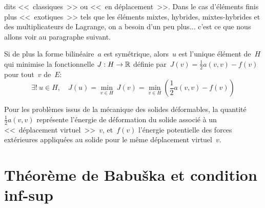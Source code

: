 \medskip
{} dits <<~classiques~>> ou <<~en déplacement~>>.
Dans le cas d'éléments finis plus <<~exotiques~>> tels que les éléments
mixtes, hybrides, mixtes-hybrides et des multiplicateurs de Lagrange, on a besoin d'un peu plus... c'est ce que nous allons voir au paragraphe suivant.


\begin{theoreme}
Si de plus la forme bilinéaire~$a$ est symétrique, alors~$u$ est
l'unique élément de~$H$ qui minimise la fonctionnelle
$J: H\rightarrow\mathbb R$ définie par~$J(v) = \frac12 a(v,v)-f(v)$ pour tout~$v$ de~$E$:
\begin{equation}
\exists!\ u \in H,\quad J(u) = \min_{v\in H}\ J(v) = \min_{v\in H} \left( \frac12 a(v,v) - f(v) \right)
\end{equation}
\end{theoreme}


\medskip



Pour les problèmes issus de la mécanique des solides déformables, la quantité~$\frac12 a(v,v)$ représente l'énergie de déformation du solide associé à un <<~déplacement virtuel~>>~$v$, et~$f(v)$ l'énergie potentielle des forces extérieures appliquées au solide pour le même déplacement virtuel~$v$.


\medskip
\section{Théorème de Babuška et condition inf-sup}\label{Sec-ThBabuska}



